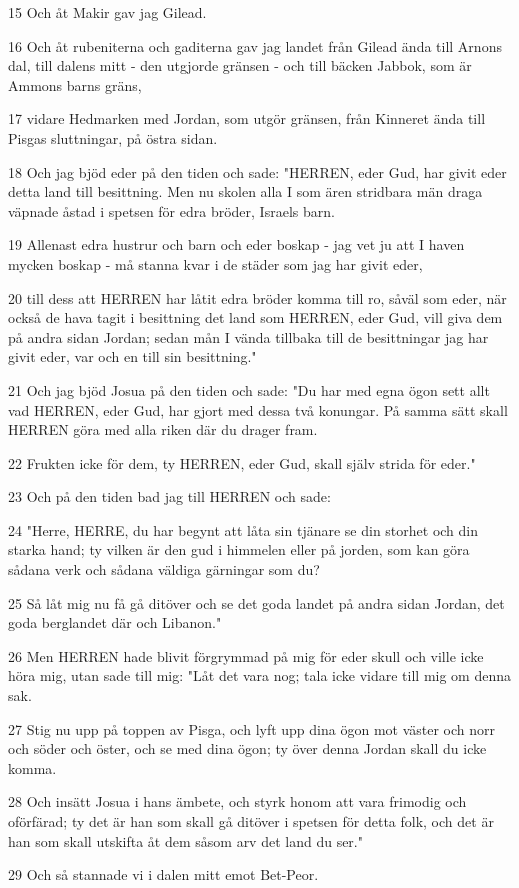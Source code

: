\par 15 Och åt Makir gav jag Gilead.
\par 16 Och åt rubeniterna och gaditerna gav jag landet från Gilead ända till Arnons dal, till dalens mitt - den utgjorde gränsen - och till bäcken Jabbok, som är Ammons barns gräns,
\par 17 vidare Hedmarken med Jordan, som utgör gränsen, från Kinneret ända till Pisgas sluttningar, på östra sidan.
\par 18 Och jag bjöd eder på den tiden och sade: "HERREN, eder Gud, har givit eder detta land till besittning. Men nu skolen alla I som ären stridbara män draga väpnade åstad i spetsen för edra bröder, Israels barn.
\par 19 Allenast edra hustrur och barn och eder boskap - jag vet ju att I haven mycken boskap - må stanna kvar i de städer som jag har givit eder,
\par 20 till dess att HERREN har låtit edra bröder komma till ro, såväl som eder, när också de hava tagit i besittning det land som HERREN, eder Gud, vill giva dem på andra sidan Jordan; sedan mån I vända tillbaka till de besittningar jag har givit eder, var och en till sin besittning."
\par 21 Och jag bjöd Josua på den tiden och sade: "Du har med egna ögon sett allt vad HERREN, eder Gud, har gjort med dessa två konungar. På samma sätt skall HERREN göra med alla riken där du drager fram.
\par 22 Frukten icke för dem, ty HERREN, eder Gud, skall själv strida för eder."
\par 23 Och på den tiden bad jag till HERREN och sade:
\par 24 "Herre, HERRE, du har begynt att låta sin tjänare se din storhet och din starka hand; ty vilken är den gud i himmelen eller på jorden, som kan göra sådana verk och sådana väldiga gärningar som du?
\par 25 Så låt mig nu få gå ditöver och se det goda landet på andra sidan Jordan, det goda berglandet där och Libanon."
\par 26 Men HERREN hade blivit förgrymmad på mig för eder skull och ville icke höra mig, utan sade till mig: "Låt det vara nog; tala icke vidare till mig om denna sak.
\par 27 Stig nu upp på toppen av Pisga, och lyft upp dina ögon mot väster och norr och söder och öster, och se med dina ögon; ty över denna Jordan skall du icke komma.
\par 28 Och insätt Josua i hans ämbete, och styrk honom att vara frimodig och oförfärad; ty det är han som skall gå ditöver i spetsen för detta folk, och det är han som skall utskifta åt dem såsom arv det land du ser."
\par 29 Och så stannade vi i dalen mitt emot Bet-Peor.

